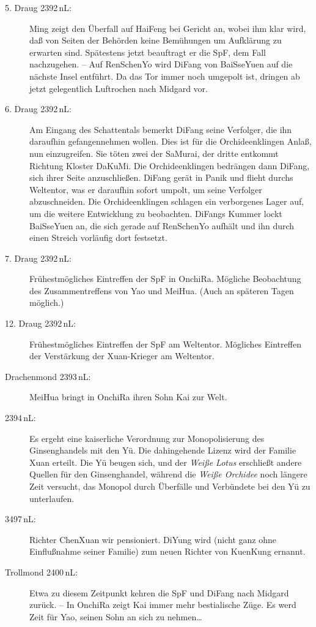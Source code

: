 \documentclass[
a4paper,
twoside,
DIV=calc,
BCOR=4mm,
fontsize=9pt,
twocolumn=on,
titlepage=on,
parskip=half
]{scrartcl}
\begin{document}
\begin{description}
\item[5. Draug 2392\,nL:] Ming zeigt den Überfall auf HaiFeng bei
  Gericht an, wobei ihm klar wird, daß von Seiten der Behörden keine
  Bemühungen um Aufklärung zu erwarten sind. Spätestens jetzt
  beauftragt er die SpF, dem Fall nachzugehen. -- Auf RenSchenYo wird
  DiFang von BaiSseYuen auf die nächste Insel entführt. Da das Tor
  immer noch umgepolt ist, dringen ab jetzt gelegentlich Luftrochen
  nach Midgard vor.
\item[6. Draug 2392\,nL:] Am Eingang des Schattentals bemerkt DiFang
  seine Verfolger, die ihn daraufhin gefangennehmen wollen. Dies ist
  für die Orchideenklingen Anlaß, nun einzugreifen. Sie töten zwei der
  SaMurai, der dritte entkommt Richtung Kloster DaKuMi. Die
  Orchideenklingen bedrängen dann DiFang, sich ihrer Seite
  anzuschließen. DiFang gerät in Panik und flieht durchs Weltentor,
  was er daraufhin sofort umpolt, um seine Verfolger
  abzuschneiden. Die Orchideenklingen schlagen ein verborgenes Lager
  auf, um die weitere Entwicklung zu beobachten. DiFangs Kummer lockt
  BaiSseYuen an, die sich gerade auf RenSchenYo aufhält und ihn durch
  einen Streich vorläufig dort festsetzt.
\item[7. Draug 2392\,nL:] Frühestmögliches Eintreffen der SpF in
  OnchiRa. Mögliche Beobachtung des Zusammentreffens von Yao und
  MeiHua. (Auch an späteren Tagen möglich.)
\item[12. Draug 2392\,nL:] Frühestmögliches Eintreffen der SpF am
  Weltentor. Mögliches Eintreffen der Verstärkung der Xuan-Krieger am
  Weltentor.
\item[Drachenmond 2393\,nL:] MeiHua bringt in OnchiRa ihren Sohn
  Kai zur Welt.
\item[2394\,nL:] Es ergeht eine kaiserliche Verordnung zur
  Monopolisierung des Ginsenghandels mit den Yü. Die dahingehende
  Lizenz wird der Familie Xuan erteilt. Die Yü beugen sich, und der
  \emph{Weiße Lotus} erschließt andere Quellen für den Ginsenghandel,
  während die \emph{Weiße Orchidee} noch längere Zeit versucht, das
  Monopol durch Überfälle und Verbündete bei den Yü zu unterlaufen.
\item[3497\,nL:] Richter ChenXuan wir pensioniert. DiYung wird (nicht
  ganz ohne Einflußnahme seiner Familie) zum neuen Richter von
  KuenKung ernannt.
\item[Trollmond 2400\,nL:] Etwa zu diesem Zeitpunkt kehren die SpF
  und DiFang nach Midgard zurück. -- In OnchiRa zeigt Kai immer mehr
  bestialische Züge. Es werd Zeit für Yao, seinen Sohn an sich zu
  nehmen\dots
\end{description}
\end{document}
